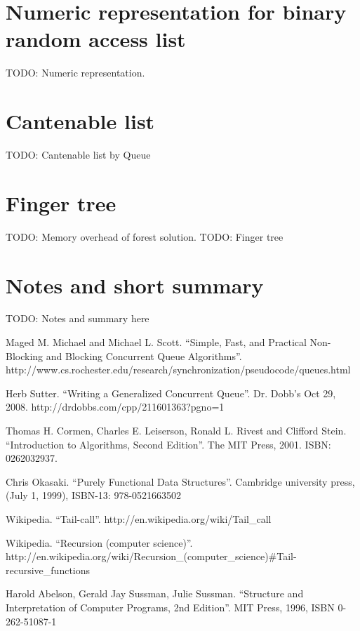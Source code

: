 \documentclass{article}
\begin{document}
\section{Numeric representation for binary random access list}
TODO: Numeric representation.

\section{Cantenable list}
TODO: Cantenable list by Queue

\section{Finger tree}
TODO: Memory overhead of forest solution.
TODO: Finger tree


\section{Notes and short summary}

TODO: Notes and summary here


\begin{thebibliography}{99}

Maged M. Michael and Michael L. Scott. ``Simple, Fast, and Practical Non-Blocking and Blocking Concurrent Queue Algorithms''. http://www.cs.rochester.edu/research/synchronization/pseudocode/queues.html

Herb Sutter. ``Writing a Generalized Concurrent Queue''. Dr. Dobb's Oct 29, 2008. http://drdobbs.com/cpp/211601363?pgno=1

Thomas H. Cormen, Charles E. Leiserson, Ronald L. Rivest and Clifford Stein. ``Introduction to Algorithms, Second Edition''. The MIT Press, 2001. ISBN: 0262032937.

Chris Okasaki. ``Purely Functional Data Structures''. Cambridge university press, (July 1, 1999), ISBN-13: 978-0521663502

Wikipedia. ``Tail-call''. http://en.wikipedia.org/wiki/Tail\_call

Wikipedia. ``Recursion (computer science)''. http://en.wikipedia.org/wiki/Recursion\_(computer\_science)\#Tail-recursive\_functions

Harold Abelson, Gerald Jay Sussman, Julie Sussman. ``Structure and Interpretation of Computer Programs, 2nd Edition''. MIT Press, 1996, ISBN 0-262-51087-1

\end{thebibliography}

\ifx\wholebook\relax \else
\end{document}
